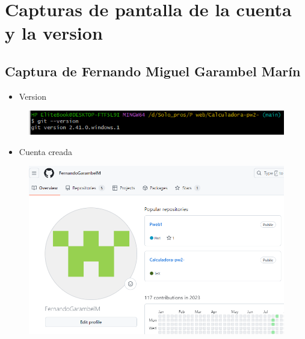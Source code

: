 \documentclass{article}
\begin{document}
	\section{Capturas de pantalla de la cuenta y la version}
		\subsection{Captura de Fernando Miguel Garambel Marín}
	\begin{itemize}
		\item Version
	\end{itemize}
	\begin{figure}[H]
		\centering
		\includegraphics[width=1.0\textwidth,keepaspectratio]{img/FernandoVersion.PNG}
	\end{figure}
	\begin{itemize}
		\item Cuenta creada
	\end{itemize}
	\begin{figure}[H]
		\centering
		\includegraphics[width=1.0\textwidth,keepaspectratio]{img/FernandoCuenta.PNG}
	\end{figure}
	\clearpage
\end{document}
